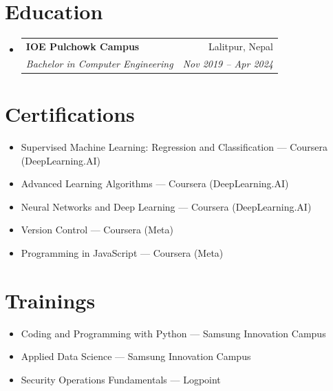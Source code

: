 \documentclass[letterpaper,11pt]{article}
\makeatletter
\newcommand{\resumeSubheading}[4]{
  \item
    \begin{tabular*}{0.97\textwidth}{l@{\extracolsep{\fill}}r}
      \textbf{#1} & #2 \\
      \textit{\small #3} & \textit{\small #4} \\
    \end{tabular*}
}
\newcommand{\resumeSubHeadingListStart}{\begin{itemize}[leftmargin=0.15in, label={}]}
\newcommand{\resumeSubHeadingListEnd}{\end{itemize}}
\makeatother
\begin{document}
\section{Education}
\resumeSubHeadingListStart
\resumeSubheading
  {IOE Pulchowk Campus}{Lalitpur, Nepal}
  {Bachelor in Computer Engineering}{Nov 2019 -- Apr 2024}
\resumeSubHeadingListEnd

\section{Certifications}
\begin{itemize}[leftmargin=0.15in, label={}]
  \item Supervised Machine Learning: Regression and Classification --- Coursera (DeepLearning.AI)
  \item Advanced Learning Algorithms --- Coursera (DeepLearning.AI)
  \item Neural Networks and Deep Learning --- Coursera (DeepLearning.AI)
  \item Version Control --- Coursera (Meta)
  \item Programming in JavaScript --- Coursera (Meta)
\end{itemize}

\section{Trainings}
\begin{itemize}[leftmargin=0.15in, label={}]
  \item Coding and Programming with Python --- Samsung Innovation Campus
  \item Applied Data Science --- Samsung Innovation Campus
  \item Security Operations Fundamentals --- Logpoint
\end{itemize}
\end{document}
